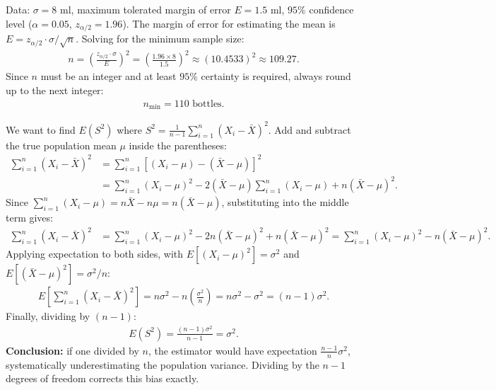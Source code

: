 \begin{solproblema}[prob:2da8cc3]
	Data: $\sigma = 8$ ml, maximum tolerated margin of error $E = 1.5$ ml, $95\%$ confidence level ($\alpha = 0.05$, $z_{\alpha/2}=1.96$). The margin of error for estimating the mean is $E = z_{\alpha/2} \cdot \sigma/\sqrt{n}$. Solving for the minimum sample size:
	\begin{align}
		n = \left( \frac{z_{\alpha/2} \cdot \sigma}{E} \right)^2 = \left( \frac{1.96 \times 8}{1.5} \right)^2 \approx (10.4533)^2 \approx 109.27.
	\end{align}
	Since $n$ must be an integer and at least $95\%$ certainty is required, always round up to the next integer:
	\begin{align}
		n_{\text{min}} = 110 \text{ bottles.}
	\end{align}
\end{solproblema}

\begin{solproblema}[prob:0c980d4]
	We want to find $E(S^2)$ where $S^2 = \frac{1}{n-1} \sum_{i=1}^n (X_i - \bar{X})^2$. Add and subtract the true population mean $\mu$ inside the parentheses:
	\begin{align}
		\sum_{i=1}^n (X_i - \bar{X})^2 &= \sum_{i=1}^n [(X_i - \mu) - (\bar{X} - \mu)]^2 \\
		&= \sum_{i=1}^n (X_i - \mu)^2 - 2(\bar{X} - \mu) \sum_{i=1}^n (X_i - \mu) + n(\bar{X} - \mu)^2.
	\end{align}
	Since $\sum_{i=1}^n (X_i - \mu) = n\bar{X} - n\mu = n(\bar{X} - \mu)$, substituting into the middle term gives:
	\begin{align}
		\sum_{i=1}^n (X_i - \bar{X})^2 &= \sum_{i=1}^n (X_i - \mu)^2 - 2n(\bar{X} - \mu)^2 + n(\bar{X} - \mu)^2 = \sum_{i=1}^n (X_i - \mu)^2 - n(\bar{X} - \mu)^2.
	\end{align}
	Applying expectation to both sides, with $E[(X_i - \mu)^2] = \sigma^2$ and $E[(\bar{X} - \mu)^2] = \sigma^2/n$:
	\begin{align}
		E\left[ \sum_{i=1}^n (X_i - \bar{X})^2 \right] = n\sigma^2 - n\left(\frac{\sigma^2}{n}\right) = n\sigma^2 - \sigma^2 = (n-1)\sigma^2.
	\end{align}
	Finally, dividing by $(n-1)$:
	\begin{align}
		E(S^2) = \frac{(n-1)\sigma^2}{n-1} = \sigma^2.
	\end{align}
	\textbf{Conclusion:} if one divided by $n$, the estimator would have expectation $\frac{n-1}{n}\sigma^2$, systematically underestimating the population variance. Dividing by the $n-1$ degrees of freedom corrects this bias exactly.
\end{solproblema}

